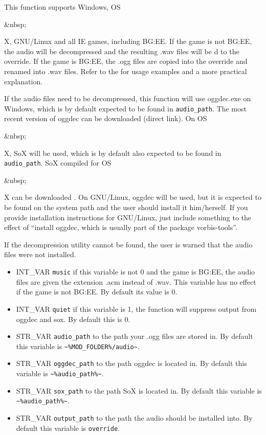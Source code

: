\documentclass{article}
\def\ttref#1{\ahrefloc{#1}{\tt #1}}
\def\t#1{{\tt #1}}
\begin{document}

This function supports Windows, OS\begin{rawhtml}&nbsp;\end{rawhtml}X, GNU/Linux and all IE games, including BG:EE. If the game is not BG:EE, the audio will be decompressed and the resulting .wav files will be \ttref{MOVE}d to the override. If the game is BG:EE, the .ogg files are copied into the override and renamed into .wav files. Refer to the  for usage examples and a more practical explanation.

If the audio files need to be decompressed, this function will use oggdec.exe on Windows, which is by default expected to be found in \verb+audio_path+. The most recent version of oggdec can be downloaded  (direct link). On OS\begin{rawhtml}&nbsp;\end{rawhtml}X, SoX will be used, which is by default also expected to be found in \verb+audio_path+. SoX compiled for OS\begin{rawhtml}&nbsp;\end{rawhtml}X can be downloaded . On GNU/Linux, oggdec will be used, but it is expected to be found on the system path and the user should install it him/herself. If you provide installation instructions for GNU/Linux, just include something to the effect of ``install oggdec, which is usually part of the package vorbis-tools''.

If the decompression utility cannot be found, the user is warned that the audio files were not installed.

\begin{itemize}
\item INT_VAR \verb+music+ if this variable is not 0 and the game is BG:EE, the audio files are given the extension .acm instead of .wav. This variable has no effect if the game is not BG:EE. By default its value is 0.
\item INT_VAR \verb+quiet+ if this variable is 1, the function will suppress output from oggdec and sox. By default this is 0.
\item STR_VAR \verb+audio_path+ to the path your .ogg files are stored in. By default this variable is \verb+~%MOD_FOLDER%/audio~+.
\item STR_VAR \verb+oggdec_path+ to the path oggdec is located in. By default this variable is \verb+~%audio_path%~+.
\item STR_VAR \verb+sox_path+ to the path SoX is located in. By default this variable is \verb+~%audio_path%~+.
\item STR_VAR \verb+output_path+ to the path the audio should be installed into. By default this variable is \t{override}.
\end{itemize}
\\
\end{document}
